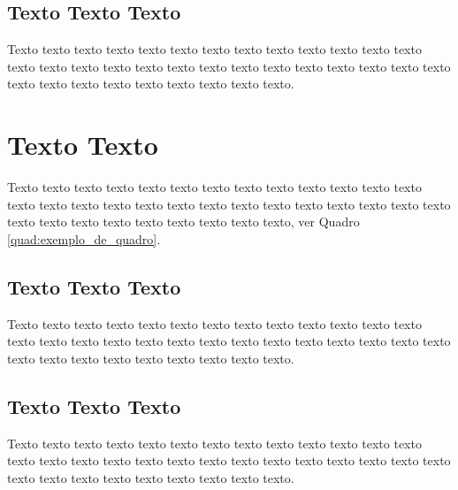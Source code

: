 \subsection{Texto Texto Texto}
\label{subsec:algumlabel}

Texto texto texto texto texto texto texto texto texto texto texto texto texto texto texto texto texto texto texto texto texto texto texto texto texto texto texto texto texto texto texto texto texto texto texto texto.

\section{Texto Texto}
\label{sec:algumlabel2}
Texto texto texto texto texto texto texto texto texto texto texto texto texto texto texto texto texto texto texto texto texto texto texto texto texto texto texto texto texto texto texto texto texto texto texto texto, ver Quadro \ref{quad:exemplo_de_quadro}.




\subsection{Texto Texto Texto}
\label{subsec:algumlabel2}
Texto texto texto texto texto texto texto texto texto texto texto texto texto texto texto texto texto texto texto texto texto texto texto texto texto texto texto texto texto texto texto texto texto texto texto texto.

\subsection{Texto Texto Texto}
\label{subsec:algumlabel3}

Texto texto texto texto texto texto texto texto texto texto texto texto texto texto texto texto texto texto texto texto texto texto texto texto texto texto texto texto texto texto texto texto texto texto texto texto.
